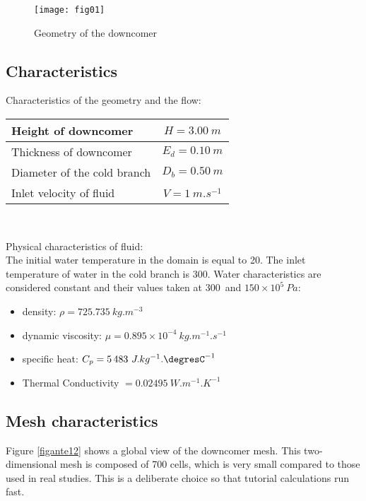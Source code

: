 \begin{figure}[h!]
\begin{center}
\texttt{[image: fig01]}
\caption{Geometry of the downcomer}
\label{figante11}
\end{center}
\end{figure}

        \subsection{Characteristics}

Characteristics of the geometry and the flow:
\begin{center}
\begin{tabular}{|l|c|}
\hline
Height of downcomer & $H = 3.00\ m$ \\
\hline
Thickness of downcomer & $E_{d} = 0.10\ m$ \\
\hline
Diameter of the cold branch & $D_{b} = 0.50\ m$ \\
\hline
Inlet velocity of fluid & $V = 1\ m.s^{-1}$ \\
\hline
\end{tabular}\\
\end{center}

Physical characteristics of fluid:\\
The initial water temperature in the domain is equal to 20\degresC.
The inlet temperature of water in the cold branch is 300\degresC.
Water characteristics are considered constant and their values taken at
300\degresC\ and $150\times 10^{5}\ Pa$:
\begin{itemize}
        \item density: $\rho = 725.735\ kg.m^{-3}$
        \item dynamic viscosity: $\mu = 0.895\times10^{-4}\ kg.m^{-1}.s^{-1}$
        \item specific heat: $C_{p} = 5\,483\ J.kg^{-1}.\mbox{\degresC}^{-1}$
        \item Thermal Conductivity $ = 0.02495\ W.m^{-1}.K^{-1}$
\end{itemize}


        \subsection{Mesh characteristics}

Figure \ref{figante12} shows a global view of the downcomer mesh. This
two-dimensional mesh is composed
of 700 cells, which is very small compared to those used in real
studies. This is
a deliberate choice so that tutorial calculations run fast.

